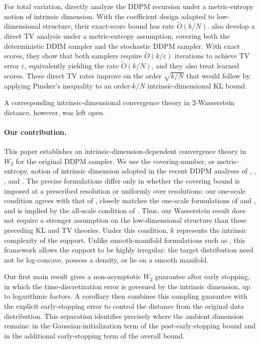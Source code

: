 \documentclass[11pt]{article}
\theoremstyle{definition}
\begin{document}
For total variation, \citet[Theorem~3]{li2025od} directly analyze the
DDPM recursion under a metric-entropy notion of intrinsic dimension.
With the coefficient design adapted to low-dimensional structure,
their exact-score bound has rate $\widetilde O(k/N)$.
\citet{liang2025lowdimtv} also develop a direct TV analysis under a
metric-entropy assumption, covering both the deterministic DDIM
sampler and the stochastic DDPM sampler. With exact scores, they show
that both samplers require $\widetilde O(k/\varepsilon)$ iterations
to achieve TV error $\varepsilon$, equivalently yielding the rate
$\widetilde O(k/N)$, and they also treat learned scores. These direct
TV rates improve on the order $\sqrt{k/N}$ that would follow by
applying Pinsker's inequality to an order-$k/N$ intrinsic-dimensional
KL bound.

A corresponding intrinsic-dimensional convergence theory
in 2-Wasserstein distance, however, was left open.

\paragraph{Our contribution.}
This paper establishes an intrinsic-dimension-dependent convergence
theory in $W_2$ for the original DDPM sampler. We use the
covering-number, or metric-entropy, notion of intrinsic dimension
adopted in the recent DDPM analyses of
\citet{li2024adapting}, \citet{huang2026optimal},
\citet{li2025od}, and \citet{liang2025lowdimtv}. The precise
formulations differ only in whether the covering bound is imposed at
a prescribed resolution or uniformly over resolutions: our one-scale
condition agrees with that of \citet{huang2026optimal}, closely
matches the one-scale formulations of \citet{li2024adapting} and
\citet{li2025od}, and is implied by the all-scale condition of
\citet{liang2025lowdimtv}. Thus, our Wasserstein result does not
require a stronger assumption on the low-dimensional structure than
these preceding KL and TV theories. Under this condition, $k$
represents the intrinsic complexity of the support. Unlike
smooth-manifold formulations such as \citet{azangulov2024manifold},
this framework allows the support to be highly irregular: the target
distribution need not be log-concave, possess a density, or lie on a
smooth manifold.

Our first main result gives a non-asymptotic $W_2$ guarantee after
early stopping, in which the time-discretization error is governed by
the intrinsic dimension, up to logarithmic factors. A corollary then
combines this sampling guarantee with the explicit early-stopping
error to control the distance from the original data distribution.
This separation identifies precisely where the ambient dimension
remains: in the Gaussian-initialization term of the post-early-stopping
bound and in the additional early-stopping term of the overall bound.
\end{document}
